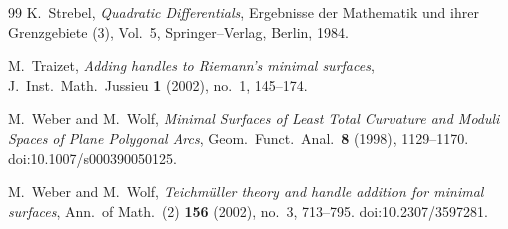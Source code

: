\documentclass[a4paper,12pt]{amsart}
\theoremstyle{plain}
\theoremstyle{definition}
\begin{document}
\begin{thebibliography}{99}
K.~Strebel,
\emph{Quadratic Differentials},
Ergebnisse der Mathematik und ihrer Grenzgebiete (3), Vol.~5,
Springer--Verlag, Berlin, 1984.

M.~Traizet,
\emph{Adding handles to Riemann's minimal surfaces},
J.\ Inst.\ Math.\ Jussieu \textbf{1} (2002), no.~1, 145--174.

M.~Weber and M.~Wolf,
\emph{Minimal Surfaces of Least Total Curvature and Moduli Spaces of Plane Polygonal Arcs},
Geom.\ Funct.\ Anal.\ \textbf{8} (1998), 1129--1170.
doi:10.1007/s000390050125.

M.~Weber and M.~Wolf,
\emph{Teichm\"uller theory and handle addition for minimal surfaces},
Ann.\ of Math.\ (2) \textbf{156} (2002), no.~3, 713--795.
doi:10.2307/3597281.

\end{thebibliography}
\end{document}
